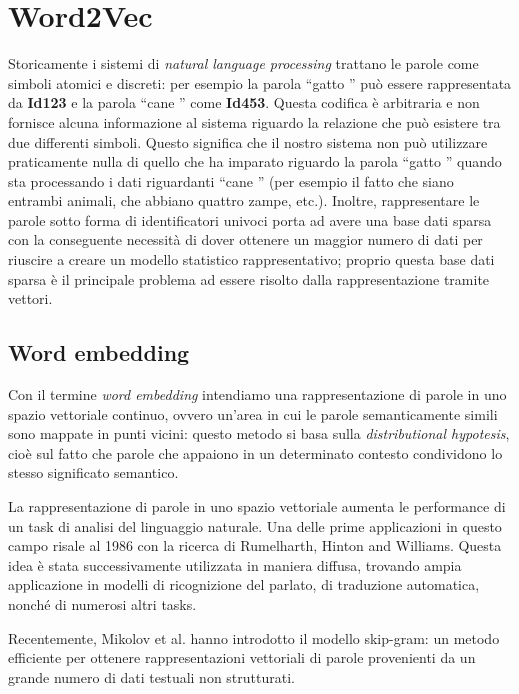 \documentclass[a4paper,12pt,openright,twoside]{report}
\theoremstyle{definition}
\begin{document}
\section{Word2Vec}
\label{sec:word2vec}
Storicamente i sistemi di \emph{natural language processing} trattano le parole come simboli atomici e discreti:
per esempio la parola ``gatto '' può essere rappresentata da \textbf{Id123} e la parola ``cane '' come \textbf{Id453}.
Questa codifica è arbitraria e non fornisce alcuna informazione al sistema riguardo la relazione
che può esistere tra due differenti simboli.
Questo significa che il nostro sistema non può utilizzare praticamente nulla di quello che ha imparato
riguardo la parola ``gatto '' quando sta processando i dati riguardanti ``cane '' (per esempio il fatto che siano
entrambi animali, che abbiano quattro zampe, etc.).
Inoltre, rappresentare le parole sotto forma di identificatori univoci porta ad avere una base dati sparsa
con la conseguente necessità di dover ottenere un maggior numero di dati per riuscire a creare un modello
statistico rappresentativo; proprio questa base dati sparsa è il principale problema 
ad essere risolto dalla rappresentazione tramite vettori.

\subsection{Word embedding}
Con il termine \emph{word embedding} intendiamo una rappresentazione di parole in uno spazio vettoriale 
continuo, ovvero un'area in cui le parole
semanticamente simili sono mappate in punti vicini: questo metodo si basa sulla \emph{distributional hypotesis}, 
cioè sul fatto che parole che appaiono in 
un determinato contesto condividono lo stesso significato semantico.

La rappresentazione di parole in uno spazio vettoriale aumenta le performance
di un task di analisi del linguaggio naturale. Una delle prime
applicazioni in questo campo risale al 1986 con la ricerca di Rumelharth, Hinton and Williams.
Questa idea è stata successivamente utilizzata in maniera diffusa, trovando ampia 
applicazione in modelli di ricognizione del parlato,
di traduzione automatica, nonché di numerosi altri tasks.

Recentemente, Mikolov et al. hanno introdotto il modello skip-gram: 
un metodo efficiente per ottenere
rappresentazioni vettoriali di parole provenienti da un grande numero di dati testuali non strutturati.
\end{document}
